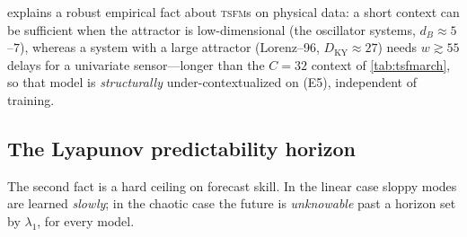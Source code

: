 \documentclass[10pt]{article}
\theoremstyle{plain}
\theoremstyle{definition}
\theoremstyle{remark}
\newcommand{\TSFM}{\textsc{tsfm}}
\newcommand{\DKY}{D_{\mathrm{KY}}}
\begin{document}
\begin{remark}
 explains a robust empirical fact about \TSFM s on physical
data: a short context can be sufficient when the attractor is low-dimensional
(the oscillator systems, $d_B\approx5$--$7$), whereas a system with a large
attractor (Lorenz--96, $\DKY\approx27$) needs $w\gtrsim55$ delays for a univariate
sensor---longer than the $C=32$ context of \cref{tab:tsfmarch}, so that model is
\emph{structurally} under-contextualized on (E5), independent of training.
\end{remark}

\subsection{The Lyapunov predictability horizon}
The second fact is a hard ceiling on forecast skill. In the linear case sloppy
modes are learned \emph{slowly}; in the chaotic case the future is
\emph{unknowable} past a horizon set by $\lambda_1$, for every model.
\end{document}
